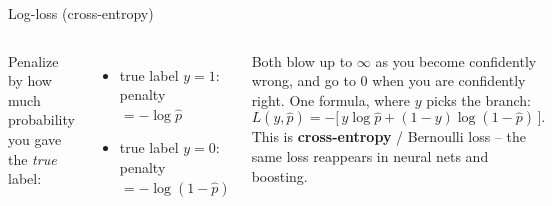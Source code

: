 \documentclass[aspectratio=169]{beamer}
\begin{document}
\begin{frame}{Log-loss (cross-entropy)}
  \begin{columns}[T]
    Penalize by how much probability you gave the \emph{true} label:
    \begin{itemize}\small
      \item true label $y=1$: penalty $= -\log \hat p$
      \item true label $y=0$: penalty $= -\log(1-\hat p)$
    \end{itemize}
    Both blow up to $\infty$ as you become confidently wrong, and go to $0$ when you are
    confidently right.
    \vskip 4pt
    One formula, where $y$ picks the branch:
    \[
      L(y,\hat p) = -\big[\, y \log \hat p + (1-y)\log(1-\hat p)\,\big].
    \]
    \footnotesize This is \textbf{cross-entropy} / Bernoulli loss -- the same loss
    reappears in neural nets and boosting.
    \begin{center}
    \end{center}
  \end{columns}
\end{frame}
\end{document}

